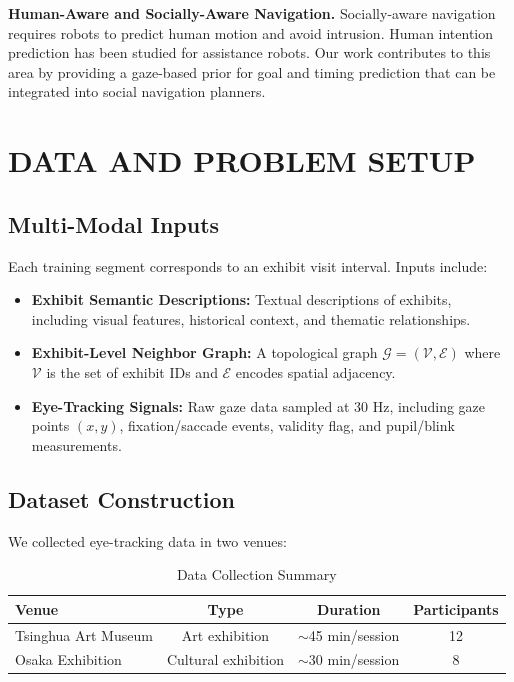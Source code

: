 \documentclass{article}
\begin{document}
\textbf{Human-Aware and Socially-Aware Navigation.} Socially-aware navigation requires robots to predict human motion and avoid intrusion. Human intention prediction has been studied for assistance robots. Our work contributes to this area by providing a gaze-based prior for goal and timing prediction that can be integrated into social navigation planners.

\section{DATA AND PROBLEM SETUP}

\subsection{Multi-Modal Inputs}

Each training segment corresponds to an exhibit visit interval. Inputs include:

\begin{itemize}
    \item \textbf{Exhibit Semantic Descriptions:} Textual descriptions of exhibits, including visual features, historical context, and thematic relationships.
    \item \textbf{Exhibit-Level Neighbor Graph:} A topological graph $\mathcal{G} = (\mathcal{V}, \mathcal{E})$ where $\mathcal{V}$ is the set of exhibit IDs and $\mathcal{E}$ encodes spatial adjacency.
    \item \textbf{Eye-Tracking Signals:} Raw gaze data sampled at 30 Hz, including gaze points $(x, y)$, fixation/saccade events, validity flag, and pupil/blink measurements.
\end{itemize}

\subsection{Dataset Construction}

We collected eye-tracking data in two venues:

\begin{table}[h]
\centering
\caption{Data Collection Summary}
\begin{tabular}{lccc}
\toprule
Venue & Type & Duration & Participants \\
\midrule
Tsinghua Art Museum & Art exhibition & $\sim$45 min/session & 12 \\
Osaka Exhibition & Cultural exhibition & $\sim$30 min/session & 8 \\
\bottomrule
\end{tabular}
\end{table}
\end{document}

